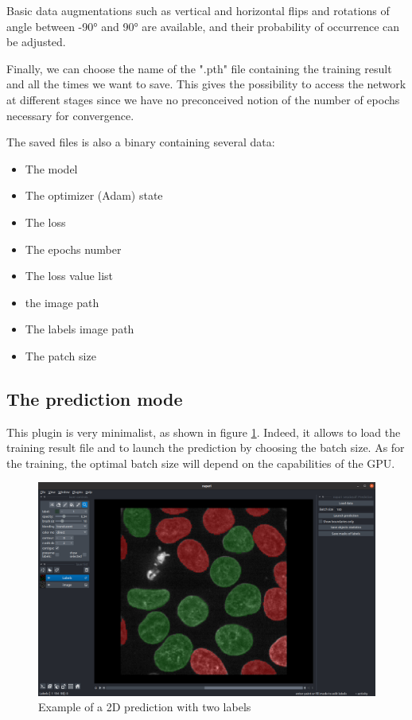 \documentclass{article}
\begin{document}
Basic data augmentations such as vertical and horizontal flips and rotations of angle between -90° and 90° are available, and their probability of occurrence can be adjusted. 

Finally, we can choose the name of the ".pth" file containing the training result and all the times we want to save. This gives the possibility to access the network at different stages since we have no preconceived notion of the number of epochs necessary for convergence.

The saved files is also a binary containing several data:
\begin{itemize}
  \item The model
  \item The optimizer (Adam) state
  \item The loss
  \item The epochs number
  \item The loss value list
  \item the image path
  \item The labels image path
  \item The patch size
\end{itemize}



\subsection{The prediction mode}

This plugin is very minimalist, as shown in figure \ref{predict}. Indeed, it allows to load the training result file and to launch the prediction by choosing the batch size. As for the training, the optimal batch size will depend on the capabilities of the GPU.

\begin{figure}[htp!]{}
 \centering
 \includegraphics[scale=0.15]{Figures/predict.png}
  \caption{Example of a 2D prediction with two labels}
  \label{predict}

\end{figure}
\end{document}

